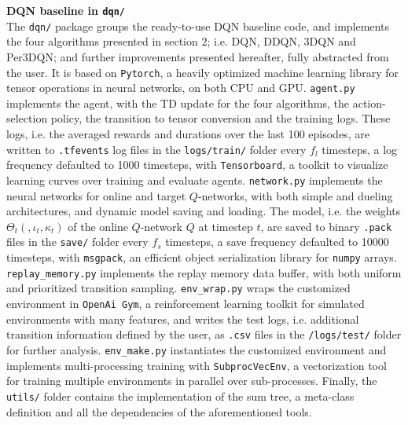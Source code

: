 \textbf{DQN baseline in \texttt{dqn/}} \\
The \texttt{dqn/} package groups the ready-to-use DQN baseline code, and implements the four algorithms presented in section 2; i.e. DQN, DDQN, 3DQN and Per3DQN; and further improvements presented hereafter, fully abstracted from the user. It is based on \texttt{Pytorch}, a heavily optimized machine learning library for tensor operations in neural networks, on both CPU and GPU. \texttt{agent.py} implements the agent, with the TD update for the four algorithms, the action-selection policy, the transition to tensor conversion and the training logs. These logs, i.e. the averaged rewards and durations over the last 100 episodes, are written to \texttt{.tfevents} log files in the \texttt{logs/train/} folder every $f_l$ timesteps, a log frequency defaulted to 1000 timesteps, with \texttt{Tensorboard}, a toolkit to visualize learning curves over training and evaluate agents. \texttt{network.py} implements the neural networks for online and target $Q$-networks, with both simple and dueling architectures, and dynamic model saving and loading. The model, i.e. the weights $\Theta_t(, \iota_t, \kappa_t)$ of the online $Q$-network $Q$ at timestep $t$, are saved to binary \texttt{.pack} files in the \texttt{save/} folder every $f_s$ timesteps, a save frequency defaulted to 10000 timesteps, with \texttt{msgpack}, an efficient object serialization library for \texttt{numpy} arrays. \texttt{replay\_memory.py} implements the replay memory data buffer, with both uniform and prioritized transition sampling. \texttt{env\_wrap.py} wraps the customized environment in \texttt{OpenAi Gym}, a reinforcement learning toolkit for simulated environments with many features, and writes the test logs, i.e. additional transition information defined by the user, as \texttt{.csv} files in the \texttt{/logs/test/} folder for further analysis. \texttt{env\_make.py} instantiates the customized environment and implements multi-processing training with \texttt{SubprocVecEnv}, a vectorization tool for training multiple environments in parallel over sub-processes. Finally, the \texttt{utils/} folder contains the implementation of the sum tree, a meta-class definition and all the dependencies of the aforementioned tools. 
\\

